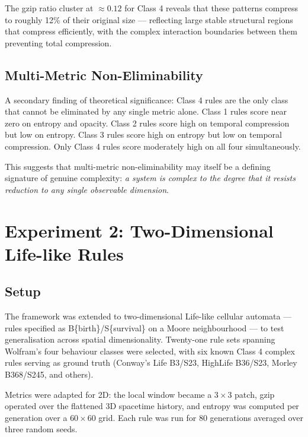 \documentclass[12pt,a4paper]{article}
\begin{document}
The gzip ratio cluster at $\approx 0.12$ for Class 4 reveals that
these patterns compress to roughly 12\% of their original size —
reflecting large stable structural regions that compress efficiently,
with the complex interaction boundaries between them preventing
total compression.

\subsection{Multi-Metric Non-Eliminability}

A secondary finding of theoretical significance: Class 4 rules are the
only class that cannot be eliminated by any single metric alone.
Class 1 rules score near zero on entropy and opacity.
Class 2 rules score high on temporal compression but low on entropy.
Class 3 rules score high on entropy but low on temporal compression.
Only Class 4 rules score moderately high on all four simultaneously.

This suggests that multi-metric non-eliminability may itself be a
defining signature of genuine complexity: \emph{a system is complex
to the degree that it resists reduction to any single observable dimension}.

\section{Experiment 2: Two-Dimensional Life-like Rules}

\subsection{Setup}

The framework was extended to two-dimensional Life-like cellular
automata — rules specified as B\{birth\}/S\{survival\} on a Moore
neighbourhood — to test generalisation across spatial dimensionality.
Twenty-one rule sets spanning Wolfram's four behaviour classes were
selected, with six known Class 4 complex rules serving as ground truth
(Conway's Life B3/S23, HighLife B36/S23, Morley B368/S245, and others).

Metrics were adapted for 2D: the local window became a $3 \times 3$
patch, gzip operated over the flattened 3D spacetime history,
and entropy was computed per generation over a $60 \times 60$ grid.
Each rule was run for 80 generations averaged over three random seeds.
\end{document}
